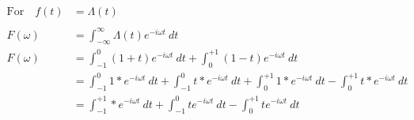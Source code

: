 \documentclass[preview]{standalone}
\begin{document}
\begin{align*}
\textrm{For} \quad f(t)&=\Lambda(t) \\ \\ F(\omega)&=\int_{-\infty}^{\infty}\Lambda(t)e^{-i\omega t} \ dt \\ F(\omega)&=\int_{-1}^{0}(1+t)e^{-i\omega t} \ dt+\int_{0}^{+1}(1-t)e^{-i\omega t} \ dt \\ &=\int_{-1}^{0}1* e^{-i\omega t} \ dt+\int_{-1}^{0}t* e^{-i\omega t} \ dt+\int_{0}^{+1}1* e^{-i\omega t} \ dt-\int_{0}^{+1}t* e^{-i\omega t} \ dt \\ &=\int_{-1}^{+1}* e^{-i\omega t} \ dt+\int_{-1}^{0}t e^{-i\omega t} \ dt-\int_{0}^{+1}t e^{-i\omega t} \ dt
\end{align*}
\end{document}

